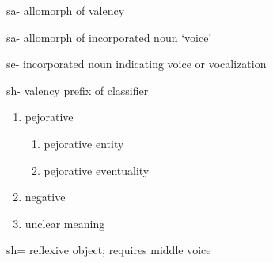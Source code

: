 \begin{morphdesc}[resume*=alphalist]
\item[sa-]\label{m:sa-val}
	allomorph of valency 

\item[sa-]\label{m:sa-voice}
	allomorph of incorporated noun  ‘voice’

\item[se-]\label{m:se-}
	incorporated noun indicating voice or vocalization

\item[sh-]\label{m:sh-}
	valency prefix of classifier
	\begin{enumerate}
	\item	pejorative
		\begin{enumerate}
		\item	pejorative entity
		\item	pejorative eventuality
		\end{enumerate}
	\item	negative
	\item	unclear meaning
	\end{enumerate}

\item[sh=]\label{m:sh=}
	reflexive object;
	requires middle voice 


\end{morphdesc}
